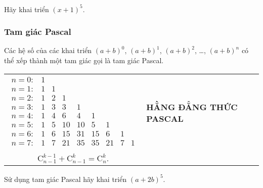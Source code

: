 \begin{vd}%
	Hãy khai triển  $\left(x+1\right)^5$.
\end{vd}



\subsubsection{Tam giác Pascal}

\begin{dn}
	Các hệ số của các khai triển $(a+b)^0$, $(a+b)^1$, $(a+b)^2$, \dots, $(a+b)^n$ có thể xếp thành một tam giác gọi là tam giác Pascal.
	\begin{longtable}{m{}m{}}
		$\begin{array}{lllllllll}
			n=0\colon & 1 & & & & & & &\\
			n=1\colon & 1 & 1 & & & & & &\\
			n=2\colon & 1 & 2 & 1 & & & & &\\
			n=3\colon & 1 & 3 & 3 & 1 & & & &\\
			n=4\colon & 1 & 4 & 6 & 4 & 1 & & &\\
			n=5\colon & 1 & 5 & 10 & 10 & 5 & 1 & &\\
			n=6\colon & 1 & 6 & 15 & 31 & 15 & 6 & 1 &\\
			n=7\colon & 1 & 7 & 21 & 35 & 35 & 21 & 7 & 1\\
		\end{array}$
		& \centerline{\bf HẰNG ĐẲNG THỨC PASCAL}\\
		$$\mathrm{C}_{n-1}^{k-1}+\mathrm{C}_{n-1}^k=\mathrm{C}_n^k.$$
	\end{longtable}
\end{dn}


\begin{vd}%
	Sử dụng tam giác Pascal hãy khai triển  $(a+2b)^5$.
\end{vd}

